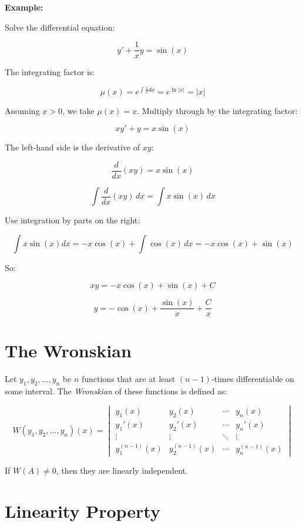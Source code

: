 \textbf{Example:}

Solve the differential equation:

\[
    y' + \frac{1}{x} y = \sin(x)
\]

The integrating factor is:

\[
    \mu(x) = e^{\int \frac{1}{x} dx} = e^{\ln|x|} = |x|
\]

Assuming \( x > 0 \), we take \( \mu(x) = x \). Multiply through by the integrating factor:

\[
    x y' + y = x \sin(x)
\]

The left-hand side is the derivative of \( x y \):

\[
    \frac{d}{dx}(x y) = x \sin(x)
\]

\[
    \int \frac{d}{dx}(x y) \, dx = \int x \sin(x)\, dx
\]

Use integration by parts on the right:

\[
    \int x \sin(x) dx = -x \cos(x) + \int \cos(x) \, dx = -x \cos(x) + \sin(x)
\]

So:

\[
    x y = -x \cos(x) + \sin(x) + C
\]

\[
    y = -\cos(x) + \frac{\sin(x)}{x} + \frac{C}{x}
\]

\section{The Wronskian}

Let \( y_1, y_2, \ldots, y_n \) be \(n\) functions that are at least
\( (n-1) \)-times differentiable on some interval. The \emph{Wronskian} of these
functions is defined as:

\[
    W(y_1, y_2, \ldots, y_n)(x) =
    \begin{vmatrix}
        y_1(x)         & y_2(x)         & \cdots & y_n(x)         \\
        y_1'(x)        & y_2'(x)        & \cdots & y_n'(x)        \\
        \vdots         & \vdots         & \ddots & \vdots         \\
        y_1^{(n-1)}(x) & y_2^{(n-1)}(x) & \cdots & y_n^{(n-1)}(x)
    \end{vmatrix}
\]

If \(W(A) \ne 0\), then they are linearly independent.

\section{Linearity Property}

